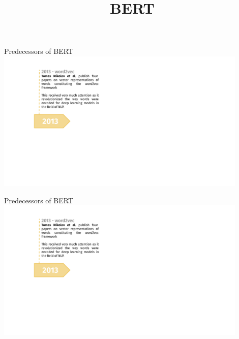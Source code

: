 



\newcommand{\titlefigure}{figure/bert.jpeg}
\newcommand{\learninggoals}{
\item Understand the use of the transformer encoder in this model
\item Understand the architectural components}

\title{BERT}
\date{}




\begin{frame}{Predecessors of BERT}
\hbox{\hspace{-3em} \includegraphics[width=12cm,page=1]{figure/transfer_learning_timeline1_nlp.pdf}}
\end{frame}
\begin{frame}[noframenumbering]{Predecessors of BERT}
\hbox{\hspace{-3em} \includegraphics[width=12cm,page=2]{figure/transfer_learning_timeline1_nlp.pdf}}
\end{frame}
